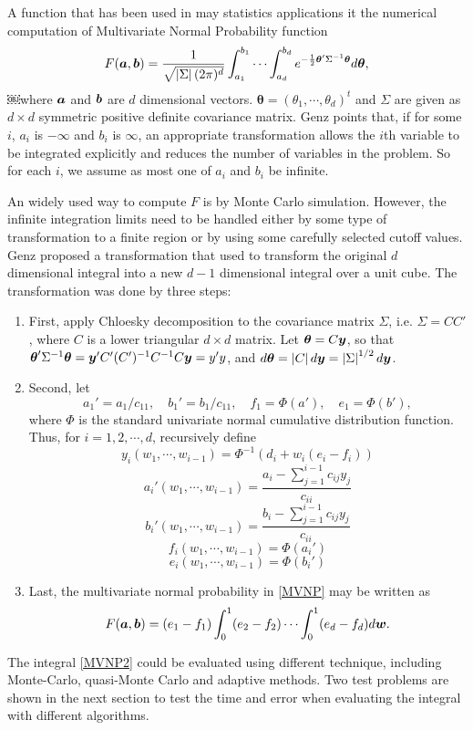 \documentclass{iitthesis}
\begin{document}
A function that has been used in may statistics applications it the numerical computation of Multivariate Normal Probability function 
\begin{equation}\label{MVNP}
F(\boldsymbol{a},\boldsymbol{b}) = \frac{1}{\sqrt{\left \lvert \Sigma \right \rvert(2\pi)^d}}\int_{a_1}^{b_1}\cdots\int_{a_d}^{b_d} e^{-\frac{1}{2} \boldsymbol{\theta}'\Sigma^{-1}\boldsymbol{\theta} }d\boldsymbol{\theta},
\end{equation}
￼where $\boldsymbol{a}$ and $\boldsymbol{b}$ are $d$ dimensional vectors. $\boldsymbol{\theta} = (\theta_1,\cdots,\theta_d)^t$ and $\Sigma$ are given as $d \times d$ symmetric positive definite covariance matrix. Genz \cite{Genz92} points that, if for some $i$, $a_i$ is $-\infty$ and $b_i$ is $\infty$, an appropriate transformation allows the $i$th variable to be integrated explicitly and reduces the number of variables in the problem. So for each $i$, we assume as most one of $a_i$ and $b_i$ be infinite. 

An widely used way to compute $F$ is by Monte Carlo simulation. However, the infinite integration limits need to be handled either by some type of transformation to a finite region or by using some carefully selected cutoff values. Genz\cite{Genz92, GenzBretz02} proposed a transformation that used to transform the original $d$ dimensional integral into a new $d-1$ dimensional integral over a unit cube. The transformation was done by three steps:
\begin{enumerate}
\item First, apply Chloesky decomposition to the covariance matrix $\Sigma$, i.e. $\Sigma = CC'$, where $C$ is a lower triangular $d \times d$ matrix. Let $\boldsymbol{\theta}=C \boldsymbol{y}$, so that $\boldsymbol{\theta}'\Sigma^{-1}\boldsymbol{\theta} = \boldsymbol{y}' C'(C')^{-1} C^{-1}C\boldsymbol{y} =y'y$, and $d\boldsymbol{\theta}=\left \lvert C \right \rvert d\boldsymbol{y} = \left \lvert \Sigma \right \rvert^{1/2} d\boldsymbol{y}$.
\item Second, let
$$a_1'=a_1/c_{11}, \quad b_1'=b_1/c_{11}, \quad f_1=\Phi(a'), \quad  e_1 = \Phi(b'),$$
where $\Phi$ is the standard univariate normal cumulative distribution function. 
Thus, for $i=1,2,\cdots,d$, recursively define
$$y_{i}(w_1,\cdots,w_{i-1}) = \Phi^{-1} (d_i+w_i(e_i-f_i))$$
$$a_i'(w_1,\cdots,w_{i-1}) = \frac{a_i-\sum_{j=1}^{i-1} c_{ij}y_j}{c_{ii}}$$
$$b_i'(w_1,\cdots,w_{i-1}) = \frac{b_i-\sum_{j=1}^{i-1} c_{ij}y_j}{c_{ii}}$$
$$f_i(w_1,\cdots,w_{i-1}) = \Phi(a_i')$$
$$e_i(w_1,\cdots,w_{i-1}) = \Phi(b_i')$$
\item Last, the multivariate normal probability in \eqref{MVNP} may be written as 
\begin{equation}\label{MVNP2}
F(\boldsymbol{a},\boldsymbol{b}) = (e_1-f_1)\int_0^1 (e_2-f_2) \cdots \int_0^1(e_d-f_d)d\boldsymbol{w}.
\end{equation}
\end{enumerate}
The integral \eqref{MVNP2} could be evaluated using different technique, including Monte-Carlo, quasi-Monte Carlo and adaptive methods. Two test problems are shown in the next section to test the time and error when evaluating the integral with different algorithms.
\end{document}
